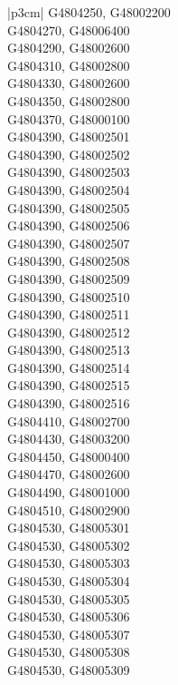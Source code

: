 \begin{customLongTable}{ |p{3cm}| }
G4804250, G48002200 \\ \hline
G4804270, G48006400 \\ \hline
G4804290, G48002600 \\ \hline
G4804310, G48002800 \\ \hline
G4804330, G48002600 \\ \hline
G4804350, G48002800 \\ \hline
G4804370, G48000100 \\ \hline
G4804390, G48002501 \\ \hline
G4804390, G48002502 \\ \hline
G4804390, G48002503 \\ \hline
G4804390, G48002504 \\ \hline
G4804390, G48002505 \\ \hline
G4804390, G48002506 \\ \hline
G4804390, G48002507 \\ \hline
G4804390, G48002508 \\ \hline
G4804390, G48002509 \\ \hline
G4804390, G48002510 \\ \hline
G4804390, G48002511 \\ \hline
G4804390, G48002512 \\ \hline
G4804390, G48002513 \\ \hline
G4804390, G48002514 \\ \hline
G4804390, G48002515 \\ \hline
G4804390, G48002516 \\ \hline
G4804410, G48002700 \\ \hline
G4804430, G48003200 \\ \hline
G4804450, G48000400 \\ \hline
G4804470, G48002600 \\ \hline
G4804490, G48001000 \\ \hline
G4804510, G48002900 \\ \hline
G4804530, G48005301 \\ \hline
G4804530, G48005302 \\ \hline
G4804530, G48005303 \\ \hline
G4804530, G48005304 \\ \hline
G4804530, G48005305 \\ \hline
G4804530, G48005306 \\ \hline
G4804530, G48005307 \\ \hline
G4804530, G48005308 \\ \hline
G4804530, G48005309 \\ \hline

\end{customLongTable}
